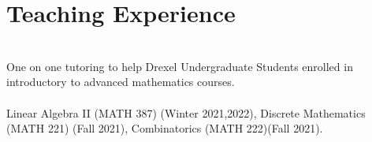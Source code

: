 \documentclass[]{deedy-resume-openfont}
\begin{document}
\begin{minipage}[t]{0.44\textwidth}

\section{Teaching Experience} 

\\
One on one tutoring to help Drexel Undergraduate Students enrolled in introductory to advanced mathematics courses.\\
\sectionsep
{}\\
Linear Algebra II (MATH 387) (Winter 2021,2022), Discrete Mathematics (MATH 221) (Fall 2021), Combinatorics (MATH 222)(Fall 2021).
\sectionsep


\end{minipage}
\end{document}
